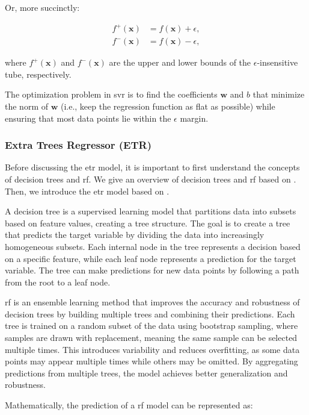 Or, more succinctly:

$$
\begin{aligned}
    f^+(\mathbf{x}) &= f(\mathbf{x}) + \epsilon, \\
    f^-(\mathbf{x}) &= f(\mathbf{x}) - \epsilon,
\end{aligned}
$$

where $f^+(\mathbf{x})$ and $f^-(\mathbf{x})$ are the upper and lower bounds of the $\epsilon$-insensitive tube, respectively.

The optimization problem in \gls{svr} is to find the coefficients $\mathbf{w}$ and $b$ that minimize the norm of $\mathbf{w}$ (i.e., keep the regression function as flat as possible) while ensuring that most data points lie within the $\epsilon$ margin.

\subsubsection{Extra Trees Regressor (ETR)}
Before discussing the \gls{etr} model, it is important to first understand the concepts of decision trees and \gls{rf}.
We give an overview of decision trees and \gls{rf} based on \citet{James2023AnIS}.
Then, we introduce the \gls{etr} model based on \citet{geurtsERF}.

A decision tree is a supervised learning model that partitions data into subsets based on feature values, creating a tree structure.
The goal is to create a tree that predicts the target variable by dividing the data into increasingly homogeneous subsets.
Each internal node in the tree represents a decision based on a specific feature, while each leaf node represents a prediction for the target variable.
The tree can make predictions for new data points by following a path from the root to a leaf node.

\gls{rf} is an ensemble learning method that improves the accuracy and robustness of decision trees by building multiple trees and combining their predictions.
Each tree is trained on a random subset of the data using bootstrap sampling, where samples are drawn with replacement, meaning the same sample can be selected multiple times.
This introduces variability and reduces overfitting, as some data points may appear multiple times while others may be omitted.
By aggregating predictions from multiple trees, the model achieves better generalization and robustness.

Mathematically, the prediction of a \gls{rf} model can be represented as:

